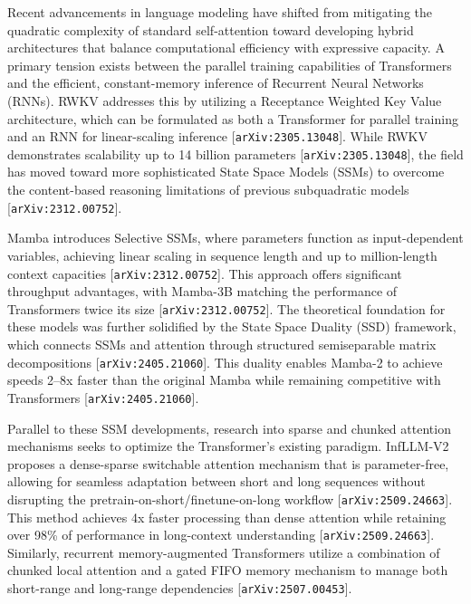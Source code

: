 \documentclass[11pt]{article}
\begin{document}
Recent advancements in language modeling have shifted from mitigating the quadratic complexity of standard self-attention toward developing hybrid architectures that balance computational efficiency with expressive capacity. A primary tension exists between the parallel training capabilities of Transformers and the efficient, constant-memory inference of Recurrent Neural Networks (RNNs). RWKV addresses this by utilizing a Receptance Weighted Key Value architecture, which can be formulated as both a Transformer for parallel training and an RNN for linear-scaling inference [\texttt{arXiv:2305.13048}]. While RWKV demonstrates scalability up to 14 billion parameters [\texttt{arXiv:2305.13048}], the field has moved toward more sophisticated State Space Models (SSMs) to overcome the content-based reasoning limitations of previous subquadratic models [\texttt{arXiv:2312.00752}].

Mamba introduces Selective SSMs, where parameters function as input-dependent variables, achieving linear scaling in sequence length and up to million-length context capacities [\texttt{arXiv:2312.00752}]. This approach offers significant throughput advantages, with Mamba-3B matching the performance of Transformers twice its size [\texttt{arXiv:2312.00752}]. The theoretical foundation for these models was further solidified by the State Space Duality (SSD) framework, which connects SSMs and attention through structured semiseparable matrix decompositions [\texttt{arXiv:2405.21060}]. This duality enables Mamba-2 to achieve speeds 2–8x faster than the original Mamba while remaining competitive with Transformers [\texttt{arXiv:2405.21060}].

Parallel to these SSM developments, research into sparse and chunked attention mechanisms seeks to optimize the Transformer's existing paradigm. InfLLM-V2 proposes a dense-sparse switchable attention mechanism that is parameter-free, allowing for seamless adaptation between short and long sequences without disrupting the pretrain-on-short/finetune-on-long workflow [\texttt{arXiv:2509.24663}]. This method achieves 4x faster processing than dense attention while retaining over 98\% of performance in long-context understanding [\texttt{arXiv:2509.24663}]. Similarly, recurrent memory-augmented Transformers utilize a combination of chunked local attention and a gated FIFO memory mechanism to manage both short-range and long-range dependencies [\texttt{arXiv:2507.00453}].
\end{document}
